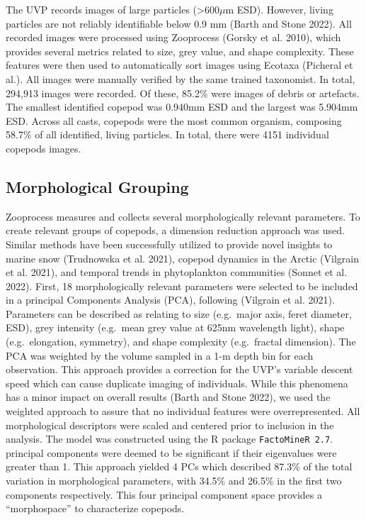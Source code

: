 \documentclass[
  letterpaper,
  DIV=11,
  numbers=noendperiod]{scrartcl}
\begin{document}
The UVP records images of large particles (\textgreater600\(\mu\)m ESD).
However, living particles are not reliably identifiable below 0.9 mm
(Barth and Stone 2022). All recorded images were processed using
Zooprocess (Gorsky et al. 2010), which provides several metrics related
to size, grey value, and shape complexity. These features were then used
to automatically sort images using Ecotaxa (Picheral et al.). All images
were manually verified by the same trained taxonomist. In total, 294,913
images were recorded. Of these, 85.2\% were images of debris or
artefacts. The smallest identified copepod was 0.940mm ESD and the
largest was 5.904mm ESD. Across all casts, copepods were the most common
organism, composing 58.7\% of all identified, living particles. In
total, there were 4151 individual copepods images.

\hypertarget{morphological-grouping}{%
\subsection{Morphological Grouping}\label{morphological-grouping}}

Zooprocess measures and collects several morphologically relevant
parameters. To create relevant groups of copepods, a dimension reduction
approach was used. Similar methods have been successfully utilized to
provide novel insights to marine snow (Trudnowska et al. 2021), copepod
dynamics in the Arctic (Vilgrain et al. 2021), and temporal trends in
phytoplankton communities (Sonnet et al. 2022). First, 18
morphologically relevant parameters were selected to be included in a
principal Components Analysis (PCA), following (Vilgrain et al. 2021).
Parameters can be described as relating to size (e.g.~major axis, feret
diameter, ESD), grey intensity (e.g.~mean grey value at 625nm wavelength
light), shape (e.g.~elongation, symmetry), and shape complexity
(e.g.~fractal dimension). The PCA was weighted by the volume sampled in
a 1-m depth bin for each observation. This approach provides a
correction for the UVP's variable descent speed which can cause
duplicate imaging of individuals. While this phenomena has a minor
impact on overall results (Barth and Stone 2022), we used the weighted
approach to assure that no individual features were overrepresented. All
morphological descriptors were scaled and centered prior to inclusion in
the analysis. The model was constructed using the R package
\texttt{FactoMineR\ 2.7}. principal components were deemed to be
significant if their eigenvalues were greater than 1. This approach
yielded 4 PCs which described 87.3\% of the total variation in
morphological parameters, with 34.5\% and 26.5\% in the first two
components respectively. This four principal component space provides a
``morphospace'' to characterize copepods.
\end{document}
